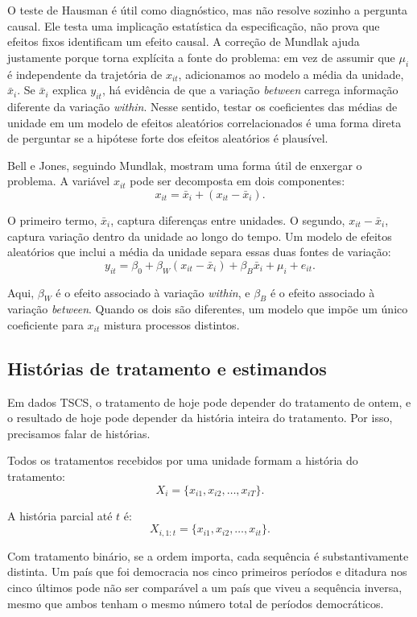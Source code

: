 \documentclass[
]{article}
\begin{document}
O teste de Hausman é útil como diagnóstico, mas não resolve sozinho a pergunta causal. Ele testa uma implicação estatística da especificação, não prova que efeitos fixos identificam um efeito causal. A correção de Mundlak ajuda justamente porque torna explícita a fonte do problema: em vez de assumir que \(\mu_i\) é independente da trajetória de \(x_{it}\), adicionamos ao modelo a média da unidade, \(\bar{x}_i\). Se \(\bar{x}_i\) explica \(y_{it}\), há evidência de que a variação \emph{between} carrega informação diferente da variação \emph{within}. Nesse sentido, testar os coeficientes das médias de unidade em um modelo de efeitos aleatórios correlacionados é uma forma direta de perguntar se a hipótese forte dos efeitos aleatórios é plausível.

Bell e Jones, seguindo Mundlak, mostram uma forma útil de enxergar o problema. A variável \(x_{it}\) pode ser decomposta em dois componentes:
\[
x_{it} = \bar{x}_i + (x_{it} - \bar{x}_i).
\]

O primeiro termo, \(\bar{x}_i\), captura diferenças entre unidades. O segundo, \(x_{it} - \bar{x}_i\), captura variação dentro da unidade ao longo do tempo. Um modelo de efeitos aleatórios que inclui a média da unidade separa essas duas fontes de variação:
\[
y_{it} = \beta_0 + \beta_W (x_{it} - \bar{x}_i) + \beta_B \bar{x}_i + \mu_i + e_{it}.
\]

Aqui, \(\beta_W\) é o efeito associado à variação \emph{within}, e \(\beta_B\) é o efeito associado à variação \emph{between}. Quando os dois são diferentes, um modelo que impõe um único coeficiente para \(x_{it}\) mistura processos distintos.

\subsection{Histórias de tratamento e estimandos}\label{histuxf3rias-de-tratamento-e-estimandos}

Em dados TSCS, o tratamento de hoje pode depender do tratamento de ontem, e o resultado de hoje pode depender da história inteira do tratamento. Por isso, precisamos falar de histórias.

Todos os tratamentos recebidos por uma unidade formam a história do tratamento:
\[
X_i = \{x_{i1}, x_{i2}, \ldots, x_{iT}\}.
\]

A história parcial até \(t\) é:
\[
X_{i,1:t} = \{x_{i1}, x_{i2}, \ldots, x_{it}\}.
\]

Com tratamento binário, se a ordem importa, cada sequência é substantivamente distinta. Um país que foi democracia nos cinco primeiros períodos e ditadura nos cinco últimos pode não ser comparável a um país que viveu a sequência inversa, mesmo que ambos tenham o mesmo número total de períodos democráticos.
\end{document}
